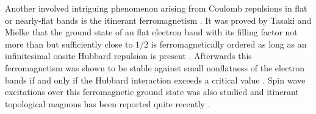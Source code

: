 \documentclass[amsmath,superscriptaddress,showpacs,aps,prb,twocolumn]{revtex4-1}
\begin{document}
\par Another involved intriguing phenomenon arising from Coulomb repulsions in flat or nearly-flat bands is the itinerant ferromagnetism \cite{T_PTP1998}. It was proved by Tasaki and Mielke that the ground state of an flat electron band with its filling factor not more than but sufficiently close to $1/2$ is ferromagnetically ordered as long as an infinitesimal onsite Hubbard repulsion is present \cite{T_PRL1992,M_PLA1993,MT_CMP1993}. Afterwards this ferromagnetism was shown to be stable against small nonflatness of the electron bands if and only if the Hubbard interaction exceeds a critical value \cite{T_PRL1994}. Spin wave excitations over this ferromagnetic ground state was also studied \cite{KA_PRL1994,SGDL_arXiv2008} and itinerant topological magnons has been reported quite recently \cite{SGDL_arXiv2008}.
\end{document}
